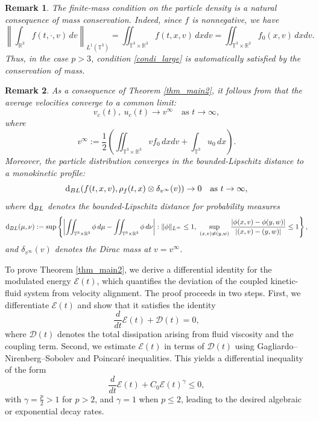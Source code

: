 \documentclass[10pt,reqno]{amsart}
\numberwithin{equation}{section}
\newtheorem{remark}{Remark}[section]
\newcommand{\R}{\mathbb R}
\newcommand{\T}{\mathbb T}
\newcommand{\lt}{\left}
\newcommand{\rt}{\right}
\newcommand{\calE}{\mathcal{E}}
\newcommand{\intt}{\int_{\T^3}}
\newcommand{\intr}{\int_{\R^3}}
\newcommand{\inttr}{\iint_{\T^3 \times \R^3}}
\begin{document}
\begin{remark}
The finite-mass condition on the particle density is a natural consequence of
mass conservation. Indeed, since $f$ is nonnegative, we have 
\[
\lt\|\intr f(t,\cdot,v)\,dv\rt\|_{L^1(\T^3)} = \inttr f(t,x,v)\,dxdv = \inttr f_0(x,v)\,dxdv.
\]
Thus, in the case $p>3$, condition \eqref{condi_large} is automatically satisfied by the conservation of mass.
\end{remark}
 

\begin{remark} 
As a consequence of Theorem \ref{thm_main2}, it follows from \cite[Remarks 1.5 \& 1.6]{Choi16} that the average velocities converge to a common limit:
\[
v_c(t), \ u_c(t) \to v^\infty \quad \mbox{as } t \to \infty,
\]
where
\[
v^\infty:= \frac12 \lt(\inttr vf_0\,dxdv + \intt u_0\,dx\rt).
\]
Moreover, the particle distribution converges in the bounded-Lipschitz distance to a monokinetic profile:
\[
{\rm d}_{BL} (f(t,x,v), \rho_f(t,x)\otimes \delta_{v^\infty}(v)) \to 0 \quad \mbox{as } t \to \infty,
\]
where ${\rm d}_{BL}$ denotes the bounded-Lipschitz distance for probability measures
\[
{\rm d}_{BL}(\mu, \nu) := \sup\lt\{ \lt|\inttr \phi \,d\mu -\inttr \phi\,d\nu\rt|  :  \|\phi\|_{L^\infty} \le 1, \    \sup_{(x,v) \neq (y,w)} \frac{|\phi(x,v) - \phi(y,w)|}{|(x,v) - (y,w)|} \le 1 \rt\},
\]
and  $\delta_{v^\infty}(v)$ denotes the Dirac mass at $v = v^\infty$. 
\end{remark}

To prove Theorem \ref{thm_main2}, we derive a differential identity for the modulated energy $\mathcal{E}(t)$, which quantifies the deviation of the coupled kinetic-fluid system from velocity alignment. The proof proceeds in two steps. First, we differentiate $\mathcal{E}(t)$ and show that it satisfies the identity 
\[
\frac{d}{dt} \mathcal{E}(t) + \mathcal{D}(t) = 0, 
\]
where $\mathcal{D}(t)$ denotes the total dissipation arising from fluid viscosity and the coupling term. Second, we estimate $\mathcal{E}(t)$ in terms of $\mathcal{D}(t)$ using Gagliardo--Nirenberg--Sobolev and Poincar\'e inequalities. This yields a differential inequality of the form
\[
\frac{d}{dt} \calE(t) + C_0 \calE(t)^{\gamma} \leq 0,
\]
with $\gamma = \frac{p}{2} > 1$ for $p > 2$, and $\gamma = 1$ when $p \le 2$, leading to the desired algebraic or exponential decay rates.

%
%
% 
%
%
\end{document}
